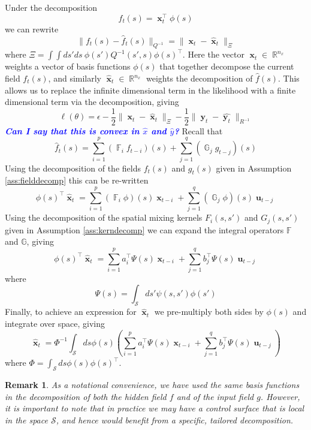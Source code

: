 \documentclass{IEEEtran}
\newcommand{\todo}[1]{\textsf{\emph{\textbf{\textcolor{blue}{#1}}}}}
\newcommand{\dist}[2]{\|#1\|_{#2}}
\DeclareMathOperator{\R}{\mathbb{R}}
\DeclareMathOperator{\F}{\mathbb{F}}
\DeclareMathOperator{\G}{\mathbb{G}}
\DeclareMathOperator{\xvec}{\mathbf{x}}
\DeclareMathOperator{\uvec}{\mathbf{u}}
\DeclareMathOperator{\yvec}{\mathbf{y}}
\newtheorem{remark}{Remark}
\begin{document}
Under the decomposition
\begin{equation}
	f_t(s) = \xvec_t^\top\phi(s)
\end{equation}
we can rewrite 
\begin{equation}
	\dist{f_t(s) - \hat{f}_t(s)}{Q^{-1}} = \dist{\xvec_t - \hat{\xvec}_t}{\Xi}
\end{equation}
where $\Xi = \int\int ds' ds ~ \phi(s')Q^{-1}(s',s)\phi(s)^\top$. Here the vector $\xvec_t \in \R^{n_x}$ weights a vector of basis functions $\phi(s)$ that together decompose the current field $f_t(s)$, and similarly $\hat{\xvec}_t \in \R^{n_x}$ weights the decomposition of $\hat{f}(s)$. This allows us to replace the infinite dimensional term in the likelihood with a finite dimensional term via the decomposition, giving
\begin{equation}
	\ell(\theta) =  \epsilon  - \frac{1}{2}\dist{\xvec_t - \hat{\xvec}_t}{\Xi} - \frac{1}{2}\dist{\yvec_t-\hat{\yvec_t}}{R^{-1}}
\end{equation}
\todo{Can I say that this is convex in $\hat{x}$ and $\hat{y}$?}
Recall that
\begin{equation}
	\hat{f}_t(s) = \sum_{i=1}^{p}( \F_i f_{t-i})(s) + \sum_{j=1}^{q}(\G_j g_{t-j})(s)
\end{equation}
Using the decomposition of the fields $f_t(s)$ and $g_t(s)$ given in Assumption \ref{ass:fielddecomp} this can be re-written
\begin{equation}
	\phi(s)^\top\hat{\xvec}_t = \sum_{i=1}^{p}(\F_i \phi)(s)\xvec_{t-i} + \sum_{j=1}^{q}(\G_j\phi)(s)\uvec_{t-j}
\end{equation}
Using the decomposition of the spatial mixing kernels $F_i(s,s')$ and $G_j(s,s')$ given in Assumption \ref{ass:kerndecomp} we can expand the integral operators $\mathbb{F}$ and $\mathbb{G}$, giving 
\begin{equation}
	\phi(s)^\top\hat{\xvec}_t =  \sum_{i=1}^{p} a_i^\top \Psi(s) \xvec_{t-i} + \sum_{j=1}^{q} b_j^\top \Psi(s) \uvec_{t-j}
\end{equation}
where 
\begin{equation}
	\Psi(s) = \int_\mathcal{S}ds' \psi(s,s') \phi(s')
\end{equation}
Finally, to achieve an expression for $\hat{\xvec}_t$ we pre-multiply both sides by $\phi(s)$ and integrate over space, giving
\begin{equation}
	\hat{\xvec}_t = \Phi^{-1} \int_\mathcal{S}ds \phi(s)\left(\sum_{i=1}^{p} a_i^\top \Psi(s) \xvec_{t-i} + \sum_{j=1}^{q} b_j^\top \Psi(s) \uvec_{t-j}\right)
\end{equation}
where $\Phi = \int_\mathcal{S}ds\phi(s)\phi(s)^\top$.
\begin{remark}
As a notational convenience, we have used the same basis functions in the decomposition of both the hidden field $f$ and of the input field $g$. However, it is important to note that in practice we may have a control surface that is local in the space $\mathcal{S}$, and hence would benefit from a specific, tailored decomposition. 
\end{remark}
\end{document}
